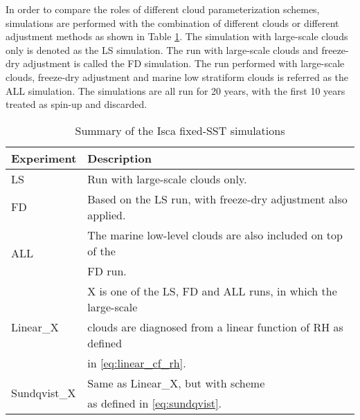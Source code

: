 In order to compare the roles of different cloud parameterization schemes, simulations are performed with the combination of different clouds or different adjustment methods as shown in Table \ref{tab:exps}. The simulation with large-scale clouds only is denoted as the LS simulation. The run with large-scale clouds and freeze-dry adjustment is called the FD simulation. The run performed with large-scale clouds, freeze-dry adjustment and marine low stratiform clouds is referred as the ALL simulation. The simulations are all run for 20 years, with the first 10 years treated as spin-up and discarded.

\begin{table}
	\caption{Summary of the Isca fixed-SST simulations}
	\vspace{0.5em}
	\centering
	\begin{tabular}{ll}
		\hline
		Experiment & Description \\
		\hline
		LS  & Run with large-scale clouds only. \\ 
		FD  & Based on the LS run, with freeze-dry adjustment also applied. \\ 
		\multirow{2}{*}{ALL} & The marine low-level clouds are also included on top of the \\
		    & FD run.  \\
		\multirow{3}{*}{Linear\_X} 	&  X is one of the LS, FD and ALL runs, in which the large-scale \\
		& clouds are diagnosed from a linear function of RH as defined\\
		& in \eqref{eq:linear_cf_rh}. \\
		\multirow{2}{*}{Sundqvist\_X} & Same as Linear\_X, but with \citet{Sundqvist1989} scheme\\ 
		& as defined in \eqref{eq:sundqvist}.\\
		\hline
	\end{tabular}
	\label{tab:exps}
\end{table}

